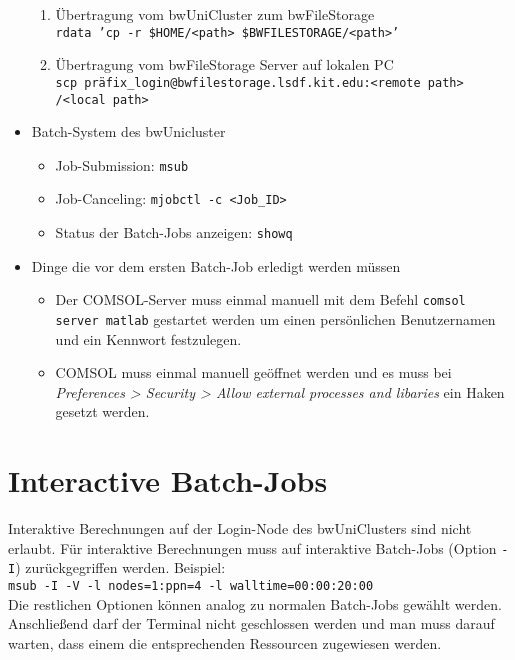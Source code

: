 \documentclass[12pt]{scrartcl}%
\theoremstyle{nonumberplain}
\begin{document}
\begin{itemize}
\begin{enumerate}
\item Übertragung vom bwUniCluster zum bwFileStorage \\ \texttt{rdata 'cp -r \$HOME/<path> \$BWFILESTORAGE/<path>'}
\item Übertragung vom bwFileStorage Server auf lokalen PC \\ \texttt{scp präfix\_login@bwfilestorage.lsdf.kit.edu:<remote path> /<local path>}
\end{enumerate}
\item Batch-System des bwUnicluster
\begin{itemize}
\item Job-Submission: \texttt{msub}
\item Job-Canceling: \texttt{mjobctl -c <Job\_ID>}
\item Status der Batch-Jobs anzeigen: \texttt{showq}
\end{itemize}
\item Dinge die vor dem ersten Batch-Job erledigt werden müssen
\begin{itemize}
\item Der COMSOL-Server muss einmal manuell mit dem Befehl \texttt{comsol server matlab} gestartet werden um einen persönlichen Benutzernamen und ein Kennwort festzulegen.
\item COMSOL muss einmal manuell geöffnet werden und es muss bei \textit{Preferences > Security > Allow external processes and libaries} ein Haken gesetzt werden.
\end{itemize}
\end{itemize}

\section{Interactive Batch-Jobs}
Interaktive Berechnungen auf der Login-Node des bwUniClusters sind nicht erlaubt. Für interaktive Berechnungen muss auf interaktive Batch-Jobs (Option \texttt{-I}) zurückgegriffen werden. Beispiel:\\
\hspace*{0.5cm} \texttt{msub -I -V -l nodes=1:ppn=4 -l walltime=00:00:20:00} \\
Die restlichen Optionen können analog zu normalen Batch-Jobs gewählt werden.\\
Anschließend darf der Terminal nicht geschlossen werden und man muss darauf warten, dass einem die entsprechenden Ressourcen zugewiesen werden.
\end{document}
